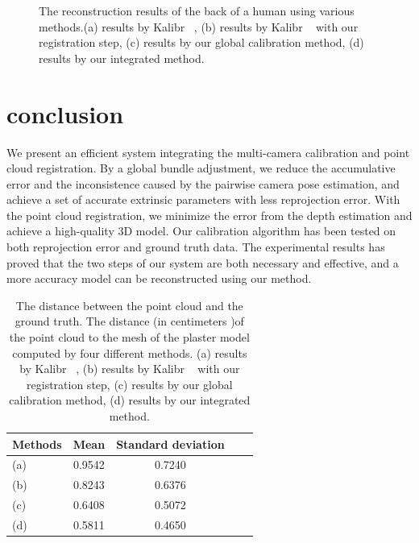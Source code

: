 \begin{figure}[ht]
{\begin{minipage}[c]{.22\linewidth}
\end{minipage}
}
\caption{The reconstruction results of the back of a human using various methods.(a) results by Kalibr ~\cite{Maye2013Self}, (b) results by Kalibr ~\cite{Maye2013Self} with our registration step, (c) results by our global calibration method, (d) results by our integrated method.}
\label{fig:pointcloud}
\end{figure}
\section{conclusion}
We present an efficient system integrating the multi-camera calibration and point cloud registration. By a global bundle adjustment, we reduce the accumulative error and the inconsistence caused by the pairwise camera pose estimation, and achieve a set of accurate extrinsic parameters with less reprojection error. With the point cloud registration, we minimize the error from the depth estimation and achieve a high-quality 3D model. Our calibration algorithm has been tested on both reprojection error and ground truth data. The experimental results has proved that the two steps of our system are both necessary and effective, and a more accuracy model can be reconstructed using our method.
\begin{table}
	\centering
	\caption{The distance between the point cloud and the ground truth. The distance (in centimeters )of the point cloud to the mesh of the plaster model computed by four different methods. (a) results by Kalibr ~\cite{Maye2013Self}, (b) results by Kalibr ~\cite{Maye2013Self} with our registration step, (c) results by our global calibration method, (d) results by our integrated method.}
	\label{tab:distance}
	\begin{tabular}{lcccc}
		\hline
		Methods & Mean &Standard deviation\\
		\hline
		(a) &0.9542 &0.7240\\

		(b) &0.8243 &0.6376\\
		
		(c) &0.6408 &0.5072\\
		
		(d) &0.5811 &0.4650\\
		\hline
		
	\end{tabular}
\label{fig:distance}
\end{table}


